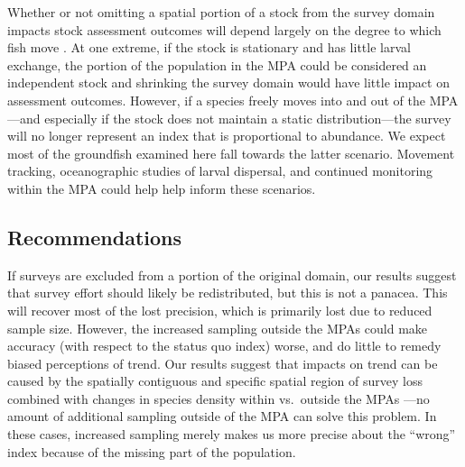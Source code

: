 \documentclass[12pt]{article}
\begin{document}
Whether or not omitting a spatial portion of a stock from the survey domain impacts stock assessment outcomes will depend largely on the degree to which fish move \citep{field2006}.
At one extreme, if the stock is stationary and has little larval exchange, the portion of the population in the MPA could be considered an independent stock and shrinking the survey domain would have little impact on assessment outcomes.
However, if a species freely moves into and out of the MPA---and especially if the stock does not maintain a static distribution---the survey will no longer represent an index that is proportional to abundance.
We expect most of the groundfish examined here fall towards the latter scenario.
Movement tracking, oceanographic studies of larval dispersal, and continued monitoring within the MPA could help help inform these scenarios.

\subsection*{Recommendations}

If surveys are excluded from a portion of the original domain, our results suggest that survey effort should likely be redistributed, but this is not a panacea.
This will recover most of the lost precision, which is primarily lost due to reduced sample size.
However, the increased sampling outside the MPAs could make accuracy (with respect to the status quo index) worse, and do little to remedy biased perceptions of trend.
Our results suggest that impacts on trend can be caused by the spatially contiguous and specific spatial region of survey loss combined with changes in species density within vs.\ outside the MPAs \citep[a form of spatially varying population trends,][]{barnett2021a}---no amount of additional sampling outside of the MPA can solve this problem.
In these cases, increased sampling merely makes us more precise about the ``wrong'' index because of the missing part of the population.
\end{document}
